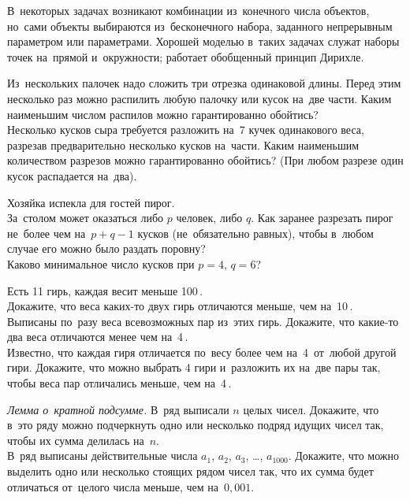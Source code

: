 



В~некоторых задачах возникают комбинации из~конечного числа объектов, но~сами
объекты выбираются из~бесконечного набора, заданного непрерывным параметром или
параметрами.
Хорошей моделью в~таких задачах служат наборы точек на~прямой и~окружности;
работает обобщенный принцип Дирихле.

\begin{exercises}


\item
\subproblem
Из~нескольких палочек надо сложить три отрезка одинаковой длины.
Перед этим несколько раз можно распилить любую палочку или кусок на~две части.
Каким наименьшим числом распилов можно гарантированно обойтись?
\\
\subproblem
Несколько кусков сыра требуется разложить на~7 кучек одинакового веса, разрезав
предварительно несколько кусков на~части.
Каким наименьшим количеством разрезов можно гарантированно обойтись?
(При любом разрезе один кусок распадается на~два).

\item
Хозяйка испекла для гостей пирог.
\\
\subproblem
За~столом может оказаться либо $p$ человек, либо $q$.
Как заранее разрезать пирог не~более чем на~$p + q - 1$ кусков
(не~обязательно равных), чтобы в~любом случае его можно было раздать поровну?
\\
\subproblem
Каково минимальное число кусков при $p = 4$, $q = 6$?

\item
Есть 11 гирь, каждая весит меньше 100\,.
\\
\subproblem
Докажите, что веса каких-то двух гирь отличаются меньше, чем на~10\,.
\\
\subproblem
Выписаны по~разу веса всевозможных пар из~этих гирь.
Докажите, что какие-то два веса отличаются менее чем на~4\,.
\\
\subproblem
Известно, что каждая гиря отличается по~весу более чем на~4\,
от~любой другой гири.
Докажите, что можно выбрать 4 гири и~разложить их на~две пары так, чтобы веса
пар отличались меньше, чем на~4\,.

\item
\subproblem
\emph{Лемма о~кратной подсумме.}
В~ряд выписали $n$ целых чисел.
Докажите, что в~это ряду можно подчеркнуть одно или несколько подряд идущих
чисел так, чтобы их сумма делилась на~$n$.
\\
\subproblem
В~ряд выписаны действительные числа
$a_{1}$, $a_{2}$, $a_{3}$, \ldots, $a_{1000}$.
Докажите, что можно выделить одно или несколько стоящих рядом чисел так, что их
сумма будет отличаться от~целого числа меньше, чем на~$0{,}001$.

\end{exercises}

